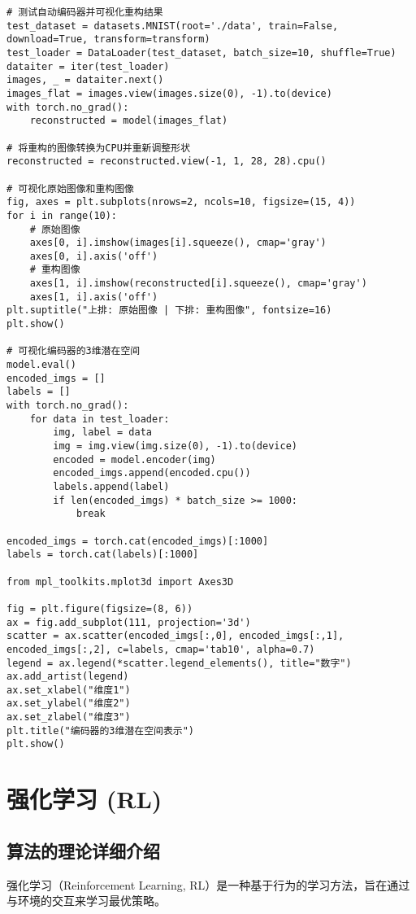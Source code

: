 \begin{lstlisting}
# 测试自动编码器并可视化重构结果
test_dataset = datasets.MNIST(root='./data', train=False, download=True, transform=transform)
test_loader = DataLoader(test_dataset, batch_size=10, shuffle=True)
dataiter = iter(test_loader)
images, _ = dataiter.next()
images_flat = images.view(images.size(0), -1).to(device)
with torch.no_grad():
    reconstructed = model(images_flat)

# 将重构的图像转换为CPU并重新调整形状
reconstructed = reconstructed.view(-1, 1, 28, 28).cpu()

# 可视化原始图像和重构图像
fig, axes = plt.subplots(nrows=2, ncols=10, figsize=(15, 4))
for i in range(10):
    # 原始图像
    axes[0, i].imshow(images[i].squeeze(), cmap='gray')
    axes[0, i].axis('off')
    # 重构图像
    axes[1, i].imshow(reconstructed[i].squeeze(), cmap='gray')
    axes[1, i].axis('off')
plt.suptitle("上排: 原始图像 | 下排: 重构图像", fontsize=16)
plt.show()

# 可视化编码器的3维潜在空间
model.eval()
encoded_imgs = []
labels = []
with torch.no_grad():
    for data in test_loader:
        img, label = data
        img = img.view(img.size(0), -1).to(device)
        encoded = model.encoder(img)
        encoded_imgs.append(encoded.cpu())
        labels.append(label)
        if len(encoded_imgs) * batch_size >= 1000:
            break

encoded_imgs = torch.cat(encoded_imgs)[:1000]
labels = torch.cat(labels)[:1000]

from mpl_toolkits.mplot3d import Axes3D

fig = plt.figure(figsize=(8, 6))
ax = fig.add_subplot(111, projection='3d')
scatter = ax.scatter(encoded_imgs[:,0], encoded_imgs[:,1], encoded_imgs[:,2], c=labels, cmap='tab10', alpha=0.7)
legend = ax.legend(*scatter.legend_elements(), title="数字")
ax.add_artist(legend)
ax.set_xlabel("维度1")
ax.set_ylabel("维度2")
ax.set_zlabel("维度3")
plt.title("编码器的3维潜在空间表示")
plt.show()

\end{lstlisting}


\section{强化学习 (RL)}
\subsection*{算法的理论详细介绍}
强化学习（Reinforcement Learning, RL）是一种基于行为的学习方法，旨在通过与环境的交互来学习最优策略。

